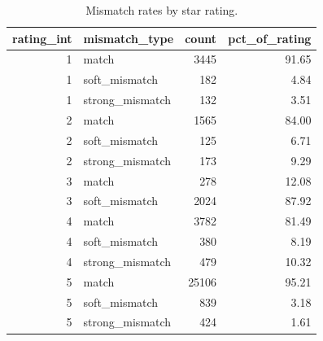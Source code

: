 \begin{table}
\caption{Mismatch rates by star rating.}
\label{tab:mismatch_by_rating}
\begin{tabular}{rlrr}
\toprule
rating_int & mismatch_type & count & pct_of_rating \\
\midrule
1 & match & 3445 & 91.65 \\
1 & soft_mismatch & 182 & 4.84 \\
1 & strong_mismatch & 132 & 3.51 \\
2 & match & 1565 & 84.00 \\
2 & soft_mismatch & 125 & 6.71 \\
2 & strong_mismatch & 173 & 9.29 \\
3 & match & 278 & 12.08 \\
3 & soft_mismatch & 2024 & 87.92 \\
4 & match & 3782 & 81.49 \\
4 & soft_mismatch & 380 & 8.19 \\
4 & strong_mismatch & 479 & 10.32 \\
5 & match & 25106 & 95.21 \\
5 & soft_mismatch & 839 & 3.18 \\
5 & strong_mismatch & 424 & 1.61 \\
\bottomrule
\end{tabular}
\end{table}
